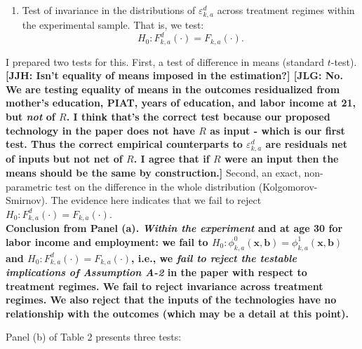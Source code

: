 \begin{enumerate}
\item Test of invariance in the distributions of $\varepsilon_{k,a}^d$ across treatment regimes within the experimental sample. That is, we test:
	\begin{equation} 
	H_0: F_{k,a}^d \left( \cdot \right) = F_{k,a} \left( \cdot \right).
	\end{equation}
\end{enumerate}

\noindent I prepared two tests for this. First, a test of difference in means (standard $t$-test). \textbf{[JJH: Isn't equality of means imposed in the estimation?] [JLG: No. We are testing equality of means in the outcomes residualized from mother's education, PIAT, years of education, and labor income at 21, but \textit{not} of $R$. I think that's the correct test because our proposed technology in the paper does not have $R$ as input - which is our first test. Thus the correct empirical counterparts to $\varepsilon_{k,a}^d$ are residuals net of inputs but not net of $R$. I agree that if $R$ were an input then the means should be the same by construction.]} Second, an exact, non-parametric test on the difference in the whole distribution (Kolgomorov-Smirnov). The evidence here indicates that we fail to reject $H_0: F_{k,a}^d \left( \cdot \right) = F_{k,a} \left( \cdot \right)$.\\ 

\noindent \textbf{Conclusion from Panel (a). \textit{Within the experiment} and at age 30 for labor income and employment: we fail to $H_0: \phi_{k,a}^0 \left( \bm{x}, \bm{b} \right) = \phi_{k,a}^1 \left( \bm{x}, \bm{b} \right)$ and $H_0: F_{k,a}^d \left( \cdot \right) = F_{k,a} \left( \cdot \right)$, i.e., we \textit{fail to reject the testable implications of Assumption A-2} in the paper with respect to treatment regimes. We fail to reject invariance across treatment regimes. We also reject that the inputs of the technologies have no relationship with the outcomes (which may be a detail at this point).}

\noindent Panel (b) of Table 2 presents three tests: 

